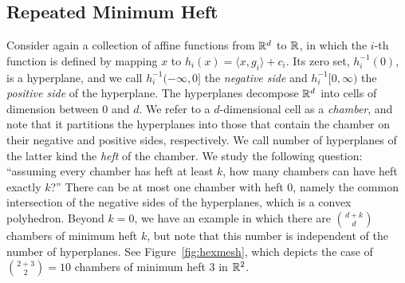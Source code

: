 \documentclass[10pt,a4paper]{article}
\newcommand {\mm}[1] {\ifmmode{#1}\else{\mbox{\(#1\)}}\fi}
\newcommand {\scalprod}[2] {{\langle #1 , #2 \rangle}}
\theoremstyle{plain}
\newcommand{\Rspace}        {\mm{{\mathbb R}}}
\begin{document}
\subsection{Repeated Minimum Heft}
\label{sec:4.3}
Consider again a collection of affine functions from $\Rspace^d$ to $\Rspace$, in which the $i$-th function is defined by mapping $x$ to $h_i (x) = \scalprod{x}{g_i} + c_i$.
Its zero set, $h_i^{-1} (0)$, is a hyperplane, and we call $h_i^{-1} (-\infty, 0]$ the \emph{negative side} and $h_i^{-1} [0, \infty)$ the \emph{positive side} of the hyperplane.
The hyperplanes decompose $\Rspace^d$ into cells of dimension between $0$ and $d$.
We refer to a $d$-dimensional cell as a \emph{chamber}, and note that it partitions the hyperplanes into those that contain the chamber on their negative and positive sides, respectively.
We call number of hyperplanes of the latter kind the \emph{heft} of the chamber.
\smallskip
We study the following question: ``assuming every chamber has heft at least $k$, how many chambers can have heft exactly $k$?''
There can be at most one chamber with heft $0$, namely the common intersection of the negative sides of the hyperplanes, which is a convex polyhedron.
Beyond $k = 0$, we have an example in which there are $\binom{d+k}{d}$ chambers of minimum heft $k$, but note that this number is independent of the number of hyperplanes.
See Figure~\ref{fig:hexmesh}, which depicts the case of $\binom{2+3}{2} = 10$ chambers of minimum heft $3$ in $\Rspace^2$.
\end{document}
